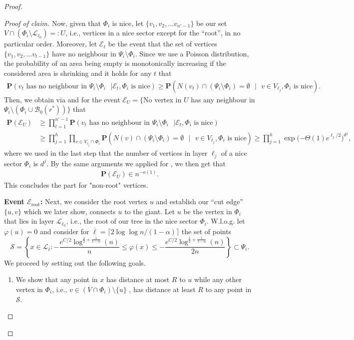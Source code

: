 \documentclass[letterpaper,11pt]{article}
\newcommand{\Prob}[1]{\mathbf{P}\left(#1\right)}
\newcommand{\B}{\mathcal B}
\newcommand{\1}{\mathbb I}
\newcommand{\Layer}[1]{\mathcal{L}_{#1}}
\begin{document}
\begin{proof}
{\begin{proof}[Proof of claim]
Now, given that $\Phi_i$ is nice, let $\{v_1, v_2, \dots v_{n' - 1}\}$ be our set $ V \cap (\Phi_i \setminus \Layer{\ell_0})=:U$, i.e., vertices in a nice sector except for the ``root'', in no particular order. Moreover, let $\mathcal{E}_t$ be the event that the set of vertices  $\{v_1, v_2,\dots v_{t-1}\}$ have no neighbour in $\Psi_i \setminus \Phi_i$. Since we use a Poisson distribution, the probability of an area being empty is monotonically increasing if the considered area is shrinking and it holds for any $t$ that
\begin{align}\label{eq:nice2}
\Prob{v_{t} \text{ has no neighbour in $\Psi_i \setminus \Phi_i$ }| \mathcal{E}_t, \Phi_i \text{ is nice}} \geq \Prob{N(v_t) \cap  (\Psi_i \setminus \Phi_i) = \emptyset \text{ }|\text{ } v \in V_{\ell_j}, \Phi_i \text{ is nice}}. 
\end{align}
%
Then,  we obtain via  and  for the event $\mathcal{E}_U= \{$No vertex in $U$ has any neighbour in $\Psi_i \setminus (\Phi_i \cup \B_0(r^*))\}$ that 
%
\begin{align*}
\Prob{\mathcal{E}_U} &\geq \prod_{t = 1}^{n'-1}\Prob{v_{t} \text{ has no neighbour in $\Psi_i \setminus \Phi_i$ }| \mathcal{E}_t, \Phi_i \text{ is nice}}\\
&\geq \prod_{j = 1}^{h}\prod_{v \in V_{\ell_j} \cap \Phi_i} \Prob{N(v) \cap  (\Psi_i \setminus \Phi_i) = \emptyset \text{ }|\text{ } v \in V_{\ell_j}, \Phi_i \text{ is nice}}  \geq \prod_{j = 1}^{h} \exp{(-\Theta(1)e^{\ell_j /2}})^{d^j},     
\end{align*}
%
where we used in the last step that the number of vertices in layer $\ell_j$ of a nice sector $\Phi_i$ is $d^j$. By the same arguments we applied for , we then get that 
%
\begin{align}\label{eq:prob-of-U}
  \Prob{\mathcal{E}_U} \in n^{-o(1)}.  
\end{align}
%
This concludes the part for "non-root" vertices. 

\smallskip

\textbf{Event $\mathcal{E}_{\text{root}}$:} Next, we consider the root vertex $u$ and establish our ``cut edge'' $\{u,v\}$ which we later show, connects $u$ to the giant. Let $u$ be the vertex in $\Phi_i$ that lies in layer $\Layer{\ell_0}$, i.e., the root of our tree in the nice sector $\Phi_i$. W.l.o.g. let $\varphi(u) = 0$ and consider for $\overline{\ell} = \lceil 2\log\log n/(1-\alpha)\rceil$ the set of points
%
$$
\mathcal{S}= \left\{x \in \Layer{\overline{\ell}} : - \frac{e^{C/2}\log^{\frac{1}{2} + \frac{1}{1-\alpha}}(n)}{n} \leq \varphi(x) \leq - \frac{e^{C/2}\log^{\frac{1}{2} + \frac{1}{1-\alpha}}(n)}{2n}\right\} \subset \Psi_i.
$$
%
We proceed by setting out the following goals.
%
\begin{enumerate}
    \item[(G1)] We show that any point in $x$ has distance at most $R$ to $u$ while any other vertex in $\Phi_i$, i.e., $v \in (V \cap \Phi_i)\setminus \{u\}$ , has distance at least $R$ to any point in $\mathcal{S}$.
    

\end{enumerate}
\end{proof}}
\end{proof}
\end{document}
